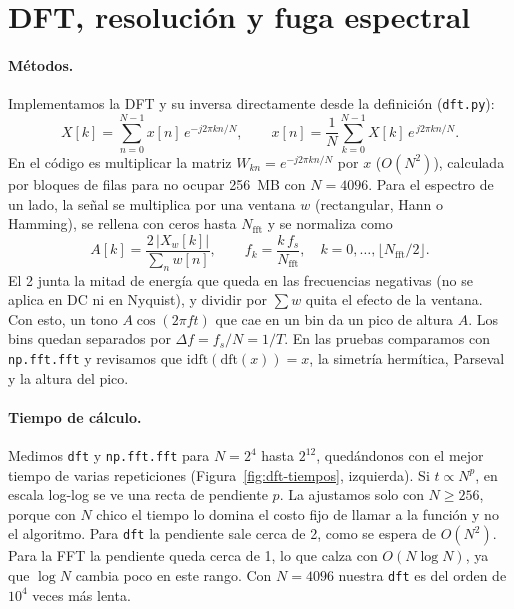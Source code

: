 
\section{DFT, resolución y fuga espectral}
\label{sec:dft}

\paragraph{Métodos.}
Implementamos la DFT y su inversa directamente desde la definición (\texttt{dft.py}):
\begin{equation}
  X[k] = \sum_{n=0}^{N-1} x[n]\, e^{-j2\pi kn/N},
  \qquad
  x[n] = \frac{1}{N}\sum_{k=0}^{N-1} X[k]\, e^{\,j2\pi kn/N}.
  \label{eq:dft}
\end{equation}
En el código es multiplicar la matriz $W_{kn}=e^{-j2\pi kn/N}$ por $x$ ($O(N^2)$), calculada por
bloques de filas para no ocupar 256~MB con $N=4096$. Para el espectro de un lado, la señal se multiplica por una ventana $w$
(rectangular, Hann o Hamming), se rellena con ceros hasta $N_{\text{fft}}$ y se normaliza como
\begin{equation}
  A[k] = \frac{2\,|X_w[k]|}{\sum_n w[n]}, \qquad f_k = \frac{k\,f_s}{N_{\text{fft}}},
  \quad k = 0,\dots,\lfloor N_{\text{fft}}/2\rfloor .
  \label{eq:espectro}
\end{equation}
El 2 junta la mitad de energía que queda en las frecuencias negativas (no se aplica en DC ni en
Nyquist), y dividir por $\sum w$ quita el efecto de la ventana. Con esto, un tono
$A\cos(2\pi f t)$ que cae en un bin da un pico de altura $A$. Los bins quedan separados por
$\Delta f = f_s/N = 1/T$. En las pruebas comparamos con \texttt{np.fft.fft} y revisamos que
$\mathrm{idft}(\mathrm{dft}(x))=x$, la simetría hermítica, Parseval y la altura del pico.

\paragraph{Tiempo de cálculo.}
Medimos \texttt{dft} y \texttt{np.fft.fft} para $N=2^4$ hasta $2^{12}$, quedándonos con el mejor
tiempo de varias repeticiones (Figura~\ref{fig:dft-tiempos}, izquierda). Si $t\propto N^p$, en
escala log-log se ve una recta de pendiente $p$. La ajustamos solo con $N\ge 256$, porque con $N$
chico el tiempo lo domina el costo fijo de llamar a la función y no el algoritmo. Para
\texttt{dft} la pendiente sale cerca de 2, como se espera de $O(N^2)$. Para la FFT la
pendiente queda cerca de 1, lo que calza con $O(N\log N)$, ya que $\log N$ cambia poco en este
rango. Con $N=4096$ nuestra \texttt{dft} es del orden de $10^4$ veces más lenta.

